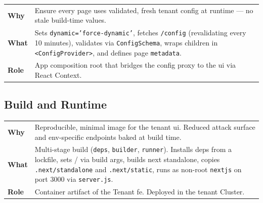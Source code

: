 \documentclass[11pt, a4paper, oneside, listof=totoc]{scrartcl}
\makeatletter
\newcommand{\codesummary}[3]{%
    \vspace{0.4\baselineskip}%
    \noindent\begin{tabularx}{\linewidth}{@{}>{\bfseries}l X@{}}
    Why  & #1\\
    What & #2\\
    Role & #3\\
    \end{tabularx}%
    \vspace{0.2\baselineskip}%
}
\makeatother
\begin{document}
                \codesummary
                    {Ensure every page uses validated, fresh tenant config at runtime --- no stale build-time values.}
                    {Sets \texttt{dynamic='force-dynamic'}, fetches \texttt{/config} (revalidating every 10 minutes), validates via \texttt{ConfigSchema}, wraps children in \texttt{<ConfigProvider>}, and defines page \texttt{metadata}.}
                    {App composition root that bridges the config proxy to the \gls{ui} via React Context.}

        \clearpage

            \subsection{Build and Runtime}
                \codesummary
                    {Reproducible, minimal image for the tenant \gls{ui}. Reduced attack surface and env-specific endpoints baked at build time.}
                    {Multi-stage build (\texttt{deps}, \texttt{builder}, \texttt{runner}). Installs deps from a lockfile, sets \texttt{\detokenize{CONFIG_ENDPOINT}}/\texttt{\detokenize{CRASH_ENDPOINT}} via build args, builds \gls{next} standalone, copies \texttt{.next/standalone} and \texttt{.next/static}, runs as non-root \texttt{nextjs} on port 3000 via \texttt{server.js}.}
                    {Container artifact of the Tenant \gls{fe}. Deployed in the tenant Cluster.}
\end{document}
